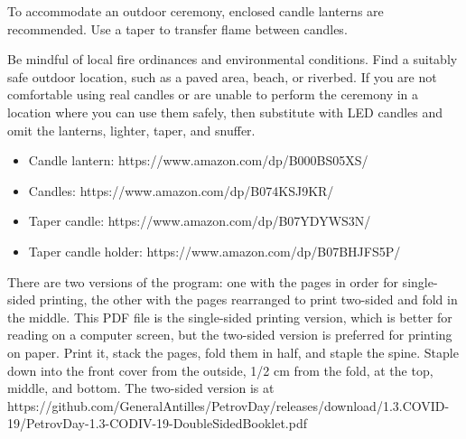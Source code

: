 \documentclass{article}
\begin{document}
To accommodate an outdoor ceremony, enclosed candle lanterns are recommended.
Use a taper to transfer flame between candles.

Be mindful of local fire ordinances and environmental conditions. Find a
suitably safe outdoor location, such as a paved area, beach, or riverbed.
If you are not comfortable using real candles or are unable to perform the
ceremony in a location where you can use them safely, then substitute with LED
candles and omit the lanterns, lighter, taper, and snuffer.

\begin{itemize} \itemsep0pt \parskip0pt 
	\item Candle lantern: https://www.amazon.com/dp/B000BS05XS/
	\item Candles: https://www.amazon.com/dp/B074KSJ9KR/
	\item Taper candle: https://www.amazon.com/dp/B07YDYWS3N/
	\item Taper candle holder: https://www.amazon.com/dp/B07BHJFS5P/
\end{itemize}

There are two versions of the program: one with the pages in order for
single-sided printing, the other with the pages rearranged to print two-sided
and fold in the middle. This PDF file is the single-sided printing version,
which is better for reading on a computer screen, but the two-sided version is
preferred for printing on paper. Print it, stack the pages, fold them in half,
and staple the spine. Staple down into the front cover from the outside, 1/2
cm from the fold, at the top, middle, and bottom. The two-sided version is at
https://github.com/GeneralAntilles/PetrovDay/releases/download/1.3.COVID-19/PetrovDay-1.3-CODIV-19-DoubleSidedBooklet.pdf
\end{document}
